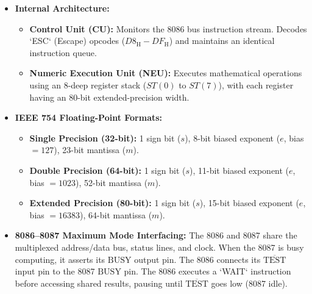 \documentclass[12pt,a4paper]{article}
\begin{document}
\begin{itemize}[leftmargin=*]
  \item \textbf{Internal Architecture:}
  \begin{itemize}[leftmargin=*]
    \item \textbf{Control Unit (CU):} Monitors the 8086 bus instruction stream. Decodes `ESC` (Escape) opcodes ($D8_{\mathrm{H}}-DF_{\mathrm{H}}$) and maintains an identical instruction queue.
    \item \textbf{Numeric Execution Unit (NEU):} Executes mathematical operations using an 8-deep register stack ($ST(0)$ to $ST(7)$), with each register having an 80-bit extended-precision width.
  \end{itemize}
  \item \textbf{IEEE 754 Floating-Point Formats:}
  \begin{itemize}[leftmargin=*]
    \item \textbf{Single Precision (32-bit):} 1 sign bit ($s$), 8-bit biased exponent ($e$, bias $= 127$), 23-bit mantissa ($m$).
    \item \textbf{Double Precision (64-bit):} 1 sign bit ($s$), 11-bit biased exponent ($e$, bias $= 1023$), 52-bit mantissa ($m$).
    \item \textbf{Extended Precision (80-bit):} 1 sign bit ($s$), 15-bit biased exponent ($e$, bias $= 16383$), 64-bit mantissa ($m$).
  \end{itemize}
  \item \textbf{8086--8087 Maximum Mode Interfacing:}
  The 8086 and 8087 share the multiplexed address/data bus, status lines, and clock. When the 8087 is busy computing, it asserts its $\mathrm{BUSY}$ output pin. The 8086 connects its $\overline{\mathrm{TEST}}$ input pin to the 8087 $\mathrm{BUSY}$ pin. The 8086 executes a `WAIT` instruction before accessing shared results, pausing until $\overline{\mathrm{TEST}}$ goes low (8087 idle).
\end{itemize}
\end{document}
